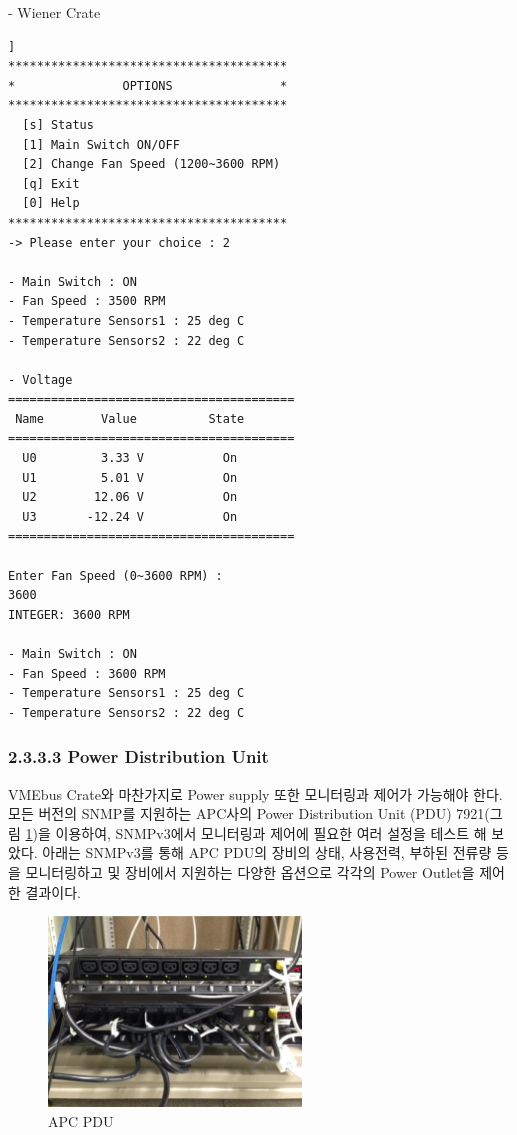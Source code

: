 \documentclass[11pt
  , a4paper
  , article
  , oneside
]{memoir}
\begin{document}
\clearpage
- Wiener Crate
\begin{lstlisting}[style=termstyle, caption=Wiener Crate 모니터링 및 제어결과]]
***************************************
*               OPTIONS               *
***************************************
  [s] Status                           
  [1] Main Switch ON/OFF               
  [2] Change Fan Speed (1200~3600 RPM) 
  [q] Exit                             
  [0] Help                             
***************************************
-> Please enter your choice : 2

- Main Switch : ON
- Fan Speed : 3500 RPM
- Temperature Sensors1 : 25 deg C
- Temperature Sensors2 : 22 deg C

- Voltage
========================================
 Name        Value          State
========================================
  U0         3.33 V           On
  U1         5.01 V           On
  U2        12.06 V           On
  U3       -12.24 V           On
========================================

Enter Fan Speed (0~3600 RPM) : 
3600
INTEGER: 3600 RPM

- Main Switch : ON
- Fan Speed : 3600 RPM
- Temperature Sensors1 : 25 deg C
- Temperature Sensors2 : 22 deg C
\end{lstlisting}

\clearpage
\subsubsection{2.3.3.3 Power Distribution Unit}
VMEbus Crate와 마찬가지로 Power supply 또한 모니터링과 제어가 가능해야 한다. 모든 버전의 SNMP를 지원하는 APC사의 Power Distribution Unit (PDU) 7921(그림 \ref{fig:apc_pdu})을 이용하여, SNMPv3에서 모니터링과 제어에 필요한 여러 설정을 테스트 해 보았다. 아래는 SNMPv3를 통해 APC PDU의 장비의 상태, 사용전력, 부하된 전류량 등을 모니터링하고 및 장비에서 지원하는 다양한 옵션으로 각각의 Power Outlet을 제어한 결과이다.
\begin{figure}[h]
  \centering
  \includegraphics[width=0.6\textwidth]{./images/apc_pdu.eps}
  \caption{APC PDU}
  \label{fig:apc_pdu}   
\end{figure}
\end{document}
